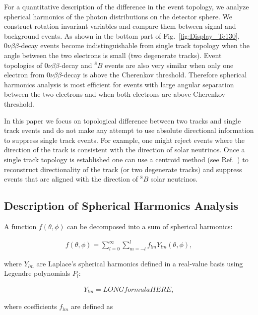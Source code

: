 \documentclass[12pt,twoside,letterpaper]{article}
\newcommand{\vbb}{0\nu\beta\beta}
\newcommand{\B}{^{8}B}
\begin{document}
For a quantitative description of the difference in the event topology, we analyze spherical harmonics of the photon distributions on the detector sphere. We construct rotation invariant variables and compare them between signal and background events. As shown in the bottom part of Fig.~\ref{fig:Display_Te130}, $\vbb$-decay events become indistinguishable from single track topology when the angle between the two electrons is small (two degenerate tracks). Event topologies of $\vbb$-decay and $\B$ events are also very similar when only one electron from $\vbb$-decay is above the Cherenkov threshold. Therefore spherical harmonics analysis is most efficient for events with large angular separation between the two electrons and when both electrons are above Cherenkov threshold. 

In this paper we focus on topological difference between two tracks and single track events and do not make any attempt to use absolute directional information to suppress single track events. For example, one might reject events where the direction of the track is consistent with the direction of solar neutrinos. Once a single track topology is established one can use a centroid method (see Ref.~\cite{Directionality}) to reconstruct directionality of the track (or two degenerate tracks) and suppress events that are aligned with the direction of $\B$ solar neutrinos.

\subsection{Description of Spherical Harmonics Analysis}

A function $f(\theta,\phi)$ can be decomposed into a sum of spherical harmonics:

\begin{eqnarray}
\label{eq1}
f(\theta,\phi) = \sum_{l=0}^{\infty} \sum_{m=-l}^{l} f_{lm} Y_{lm}(\theta,\phi),
\end{eqnarray}

where $Y_{lm}$ are Laplace's spherical harmonics defined in a real-value basis using Legendre polynomials $P_l$:

\begin{eqnarray}
\label{eq2}
Y_{lm} = LONGformulaHERE,
\end{eqnarray}

where coefficients $f_{lm}$ are defined as
 
\end{document}
